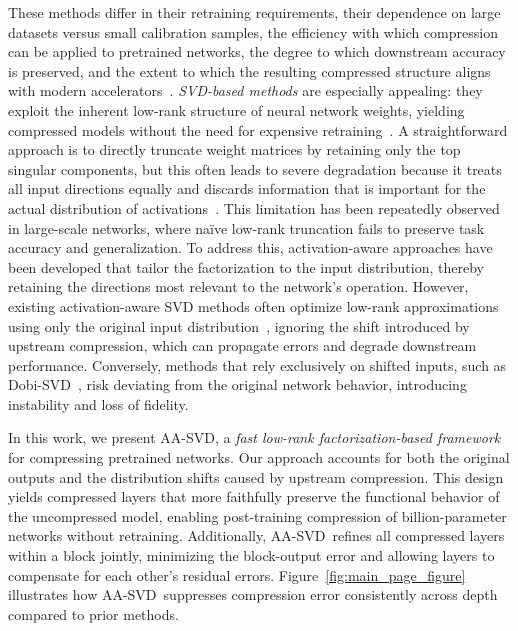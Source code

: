 \documentclass[10pt]{article} %
\theoremstyle{definition}
\theoremstyle{remark}
\newcommand{\ourmethod}{{\textsc{AA-SVD}}}
\begin{document}
These methods differ in their retraining requirements, their dependence on large datasets versus small calibration samples, the efficiency with which compression can be applied to pretrained networks, the degree to which downstream accuracy is preserved, and the extent to which the resulting compressed structure aligns with modern accelerators~\citep{cheng2018survey}.
\emph{SVD-based methods} are especially appealing: they exploit the inherent low-rank structure of neural network weights, yielding compressed models without the need for expensive retraining~\citep{denton2014exploiting,jaderberg2014speeding}.
A straightforward approach is to directly truncate weight matrices by retaining only the top singular components, but this often leads to severe degradation because it treats all input directions equally and discards information that is important for the actual distribution of activations~\citep{denil2013predicting,chen2021drone,wang2025svdllm}.
This limitation has been repeatedly observed in large-scale networks, where naïve low-rank truncation fails to preserve task accuracy and generalization.
To address this, activation-aware approaches have been developed that tailor the factorization to the input distribution, thereby retaining the directions most relevant to the network’s operation.
However, existing activation-aware SVD methods often optimize low-rank approximations using only the original input distribution~\citep{yuan2023asvd,wang2025svdllm,Li2025AdaSVD,Wang2025DobiSVD}, ignoring the shift introduced by upstream compression, which can propagate errors and degrade downstream performance.
Conversely, methods that rely exclusively on shifted inputs, such as Dobi-SVD~\citep{Wang2025DobiSVD}, risk deviating from the original network behavior, introducing instability and loss of fidelity.

In this work, we present \ourmethod, a \emph{fast low-rank factorization-based framework} for compressing pretrained networks.
Our approach accounts for both the original outputs and the distribution shifts caused by upstream compression.
This design yields compressed layers that more faithfully preserve the functional behavior of the uncompressed model, enabling post-training compression of billion-parameter networks without retraining.
Additionally, \ourmethod~refines all compressed layers within a block jointly, minimizing the block-output error and allowing layers to compensate for each other's residual errors.
Figure~\ref{fig:main_page_figure} illustrates how \ourmethod~suppresses compression error consistently across depth compared to prior methods.
\end{document}
